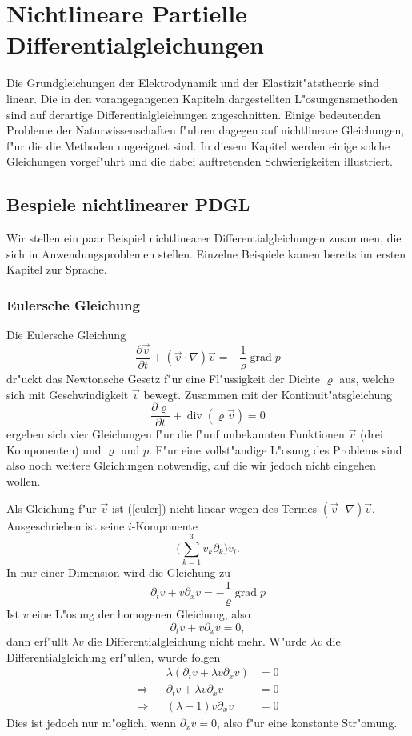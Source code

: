 %
%
%
\chapter{Nichtlineare Partielle Differentialgleichungen\label{chapter-nichtlinear}}
\rhead{}
Die Grundgleichungen der Elektrodynamik und der Elastizit"atstheorie
sind linear. Die in den vorangegangenen Kapiteln dargestellten
L"osungensmethoden sind auf derartige Differentialgleichungen
zugeschnitten. Einige bedeutenden Probleme der Naturwissenschaften
f"uhren dagegen auf nichtlineare Gleichungen, f"ur die die
Methoden ungeeignet sind. In diesem Kapitel werden einige
solche Gleichungen vorgef"uhrt und die dabei auftretenden
Schwierigkeiten illustriert.

\section{Bespiele nichtlinearer PDGL}
Wir stellen ein paar Beispiel nichtlinearer Differentialgleichungen
zusammen, die sich in Anwendungsproblemen stellen. Einzelne Beispiele
kamen bereits im ersten Kapitel zur Sprache.

\subsection{Eulersche Gleichung}
Die Eulersche Gleichung
\begin{equation}
\frac{\partial \vec v}{\partial t}+(\vec v\cdot\nabla)\vec v=-\frac1\varrho\operatorname{grad}p
\label{euler}
\end{equation}
dr"uckt das Newtonsche Gesetz f"ur eine Fl"ussigkeit der Dichte $\varrho$ aus,
welche sich mit Geschwindigkeit $\vec v$ bewegt.
Zusammen mit der Kontinuit"atsgleichung
$$
\frac{\partial\varrho}{\partial t}+\operatorname{div}(\varrho \vec v)=0
$$
ergeben sich vier Gleichungen f"ur die f"unf unbekannten Funktionen
$\vec v$ (drei Komponenten) und $\varrho$ und $p$. F"ur eine vollst"andige
L"osung des Problems sind also noch weitere Gleichungen notwendig, auf die
wir jedoch nicht eingehen wollen.

Als Gleichung f"ur $\vec v$ ist (\ref{euler}) nicht linear wegen des Termes
$(\vec v\cdot \nabla)\vec v$. Ausgeschrieben ist seine $i$-Komponente
$$\biggl(\sum_{k=1}^3v_k\partial_k\biggr)v_i.$$
In nur einer Dimension wird die Gleichung zu
$$\partial_tv+v\partial_xv=-\frac1\varrho\operatorname{grad}p$$
Ist $v$ eine L"osung der homogenen Gleichung, also
$$\partial_t v+v\partial_x v=0,$$
dann erf"ullt $\lambda v$ die Differentialgleichung nicht mehr. W"urde
$\lambda v$ die Differentialgleichung erf"ullen, wurde folgen
\begin{align*}
&&\lambda(\partial_t v+\lambda v\partial_xv)&=0
\\
\Rightarrow
&&
\partial_t v+\lambda v\partial_xv&=0
\\
\Rightarrow
&&
(\lambda -1)v\partial_xv&=0
\end{align*}
Dies ist jedoch nur m"oglich, wenn $\partial_xv=0$, also f"ur eine
konstante Str"omung.

